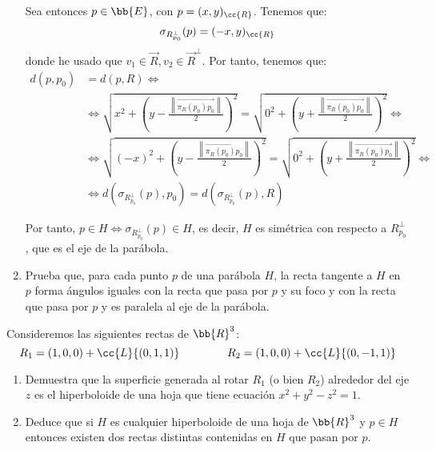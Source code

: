 \begin{ejercicio}
\begin{enumerate}
    Sea entonces $p\in \bb{E}$, con $p=(x,y)_{\cc{R}}$. Tenemos que:
    \begin{equation*}
        \sigma_{R_{p_0}^\perp}(p)= (-x,y)_{\cc{R}}
    \end{equation*}
    donde he usado que $v_1\in \vec{R}, v_2 \in \vec{R}^\perp$. Por tanto, tenemos que:
    \begin{align*}
        d(p, p_0) &= d(p, R) \Longleftrightarrow \\&\Longleftrightarrow
        \sqrt{x^2 + \left(y-\frac{\left\|\vec{\pi_R(p_0)p_0}\right\|}{2}\right)^2} = \sqrt{0^2 + \left(y+\frac{\left\|\vec{\pi_R(p_0)p_0}\right\|}{2}\right)^2} \Longleftrightarrow \\ & \Longleftrightarrow
        \sqrt{(-x)^2 + \left(y-\frac{\left\|\vec{\pi_R(p_0)p_0}\right\|}{2}\right)^2} = \sqrt{0^2 + \left(y+\frac{\left\|\vec{\pi_R(p_0)p_0}\right\|}{2}\right)^2} \Longleftrightarrow \\ & \Longleftrightarrow
        d(\sigma_{R_{p_0}^\perp}(p), p_0) = d(\sigma_{R_{p_0}^\perp}(p), R)
    \end{align*}

    Por tanto, $p\in H \Longleftrightarrow \sigma_{R_{p_0}^\perp}(p)\in H$, es decir, $H$ es simétrica con respecto a $R_{p_0}^\perp$, que es el eje de la parábola.

    \item Prueba que, para cada punto $p$ de una parábola $H$, la recta tangente a $H$ en $p$ forma ángulos iguales con la recta que pasa por $p$ y su foco y con la recta que pasa por $p$ y es paralela al eje de la parábola.
\end{enumerate}
\end{ejercicio}

\begin{ejercicio}
    Consideremos las siguientes rectas de $\bb{R}^3$:
    \begin{equation*}
        R_1 = (1, 0, 0) + \cc{L}\{(0, 1, 1)\}\hspace{1.5cm}
        R_2 = (1, 0, 0) + \cc{L}\{(0, -1, 1)\}
    \end{equation*}
    \begin{enumerate}
        \item  Demuestra que la superficie generada al rotar $R_1$ (o bien $R_2$) alrededor del eje $z$ es el hiperboloide de una hoja que tiene ecuación $x^2+y^2-z^2=1$.

        \item Deduce que si $H$ es cualquier hiperboloide de una hoja de $\bb{R}^3$ y $p \in H$ entonces existen dos rectas distintas contenidas en $H$ que pasan por $p$.
    \end{enumerate}
\end{ejercicio}


